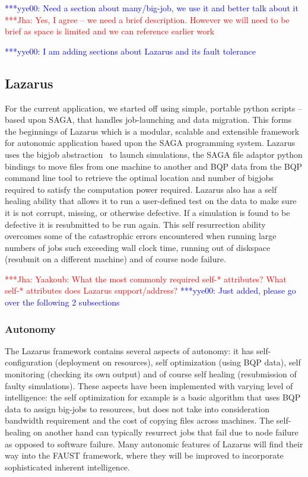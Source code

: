 \documentclass[conference,final]{IEEEtran}
\newcommand{\jhanote}[1]{ {\textcolor{red} { ***Jha: #1 }}}
\newcommand{\yyenote}[1]{ {\textcolor{blue} { ***yye00: #1 }}}
\begin{document}
\yyenote{Need a section about many/big-job, we use it and better talk
  about it} \jhanote{Yes, I agree -- we need a brief
  description. However we will need to be brief as space is limited
  and we can reference earlier work}

\yyenote{I am adding sections about Lazarus and its fault tolerance}

\subsection{Lazarus}
For the current application, we started off using simple, portable
python scripts -- based upon SAGA, that handles job-launching and data
migration. This forms the beginnings of Lazarus which is a modular,
scalable and extensible framework for autonomic application based upon
the SAGA programming system.  Lazarus uses the bigjob
abstraction~\cite{ICCS_paper, saga_royalsoc} to launch simulations,
the SAGA file adaptor python bindings to move files from one machine
to another and BQP data from the BQP command line tool to retrieve the
optimal location and number of bigjobs required to satisfy the
computation power required. Lazarus also has a self healing ability
that allows it to run a user-defined test on the data to make sure it
is not corrupt, missing, or otherwise defective. If a simulation is
found to be defective it is resubmitted to be run again. This self
resurrection ability overcomes some of the catastrophic errors
encountered when running large numbers of jobs such exceeding wall
clock time, running out of diskspace (resubmit on a different machine)
and of course node failure.

\jhanote{Yaakoub: What the most commonly required self-* attributes?
  What self-* attributes does Lazarus support/address?}
\yyenote{Just added, please go over the following 2 subsections}

\subsubsection{Autonomy}
The Lazarus framework contains several aspects of autonomy: it has
self-configuration (deployment on resources), self optimization (using
BQP data), self monitoring (checking its own output) and of course
self healing (resubmission of faulty simulations). These aspects have
been implemented with varying level of intelligence: the self
optimization for example is a basic algorithm that uses BQP data to
assign big-jobs to resources, but does not take into consideration
bandwidth requirement and the cost of copying files across
machines. The self-healing on another hand can typically resurrect
jobs that fail due to node failure as opposed to software
failure. Many autonomic features of Lazarus will find their way into
the FAUST framework, where they will be improved to incorporate
sophisticated inherent intelligence.  
\end{document}
